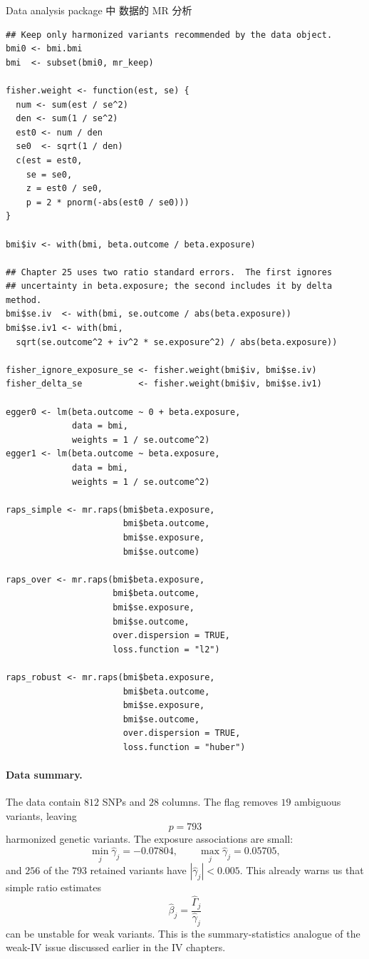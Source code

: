 \begin{exercisesolution}{Data analysis}{ package 中  数据的 MR 分析}
\begin{lstlisting}
## Keep only harmonized variants recommended by the data object.
bmi0 <- bmi.bmi
bmi  <- subset(bmi0, mr_keep)

fisher.weight <- function(est, se) {
  num <- sum(est / se^2)
  den <- sum(1 / se^2)
  est0 <- num / den
  se0  <- sqrt(1 / den)
  c(est = est0,
    se = se0,
    z = est0 / se0,
    p = 2 * pnorm(-abs(est0 / se0)))
}

bmi$iv <- with(bmi, beta.outcome / beta.exposure)

## Chapter 25 uses two ratio standard errors.  The first ignores
## uncertainty in beta.exposure; the second includes it by delta method.
bmi$se.iv  <- with(bmi, se.outcome / abs(beta.exposure))
bmi$se.iv1 <- with(bmi,
  sqrt(se.outcome^2 + iv^2 * se.exposure^2) / abs(beta.exposure))

fisher_ignore_exposure_se <- fisher.weight(bmi$iv, bmi$se.iv)
fisher_delta_se           <- fisher.weight(bmi$iv, bmi$se.iv1)

egger0 <- lm(beta.outcome ~ 0 + beta.exposure,
             data = bmi,
             weights = 1 / se.outcome^2)
egger1 <- lm(beta.outcome ~ beta.exposure,
             data = bmi,
             weights = 1 / se.outcome^2)

raps_simple <- mr.raps(bmi$beta.exposure,
                       bmi$beta.outcome,
                       bmi$se.exposure,
                       bmi$se.outcome)

raps_over <- mr.raps(bmi$beta.exposure,
                     bmi$beta.outcome,
                     bmi$se.exposure,
                     bmi$se.outcome,
                     over.dispersion = TRUE,
                     loss.function = "l2")

raps_robust <- mr.raps(bmi$beta.exposure,
                       bmi$beta.outcome,
                       bmi$se.exposure,
                       bmi$se.outcome,
                       over.dispersion = TRUE,
                       loss.function = "huber")
\end{lstlisting}

\paragraph{Data summary.}
The data contain $812$ SNPs and $28$ columns. The flag  removes $19$ ambiguous variants, leaving
\[
p=793
\]
harmonized genetic variants. The exposure associations are small:
\[
\min_j\hat{\gamma}_j=-0.07804,\qquad
\max_j\hat{\gamma}_j=0.05705,
\]
and $256$ of the $793$ retained variants have $|\hat{\gamma}_j|<0.005$. This already warns us that simple ratio estimates
\[
\hat{\beta}_j=\frac{\hat{\Gamma}_j}{\hat{\gamma}_j}
\]
can be unstable for weak variants. This is the summary-statistics analogue of the weak-IV issue discussed earlier in the IV chapters.


\end{exercisesolution}
